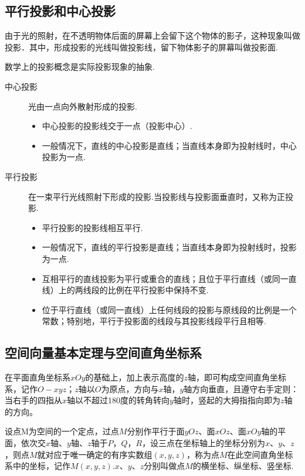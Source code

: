   \subsection{平行投影和中心投影}
    由于光的照射，在不透明物体后面的屏幕上会留下这个物体的影子，这种现象叫做投影．其中，形成投影的光线叫做投影线，留下物体影子的屏幕叫做投影面.\par
    {\kaishu 数学上的投影概念是实际投影现象的抽象.}
    \begin{description}
      \item[中心投影] 光由一点向外散射形成的投影.
        \begin{itemize}[leftmargin=*]
          \kaishu
          \item 中心投影的投影线交于一点（投影中心）.
          \item 一般情况下，直线的中心投影是直线；当直线本身即为投射线时，中心投影为一点.
        \end{itemize}
      \item[平行投影] 在一束平行光线照射下形成的投影.当投影线与投影面垂直时，又称为正投影.
        \begin{itemize}[leftmargin=*]
          \kaishu
          \item 平行投影的投影线相互平行.
          \item 一般情况下，直线的平行投影是直线；当直线本身即为投射线时，投影为一点.
          \item 互相平行的直线投影为平行或重合的直线；且位于平行直线（或同一直线）上的两线段的比例在平行投影中保持不变.
          \item 位于平行直线（或同一直线）上任何线段的投影与原线段的比例是一个常数；特别地，平行于投影面的线段与其投影线段平行且相等.
        \end{itemize}
    \end{description}
  \subsection{空间向量基本定理与空间直角坐标系}
    在平面直角坐标系$xOy$的基础上，加上表示高度的$z$轴，即可构成空间直角坐标系，记作$O-xyz$；$z$轴以$O$为原点，方向与$x$轴，$y$轴方向垂直，且遵守右手定则：当右手的四指从$x$轴以不超过180度的转角转向$y$轴时，竖起的大拇指指向即为$z$轴的方向。\par
    设点M为空间的一个定点，过点$M$分别作平行于面$yOz$、面$xOz$、面$xOy$轴的平面，依次交$x$轴、$y$轴、$z$轴于$P$，$Q$，$R$，设三点在坐标轴上的坐标分别为$x$、$y$、$z$，则点$M$就对应于唯一确定的有序实数组$(x,y,z)$，称为点$M$在此空间直角坐标系中的坐标，记作$M(x,y,z)$.$x$、$y$、$z$分别叫做点$M$的横坐标、纵坐标、竖坐标.
